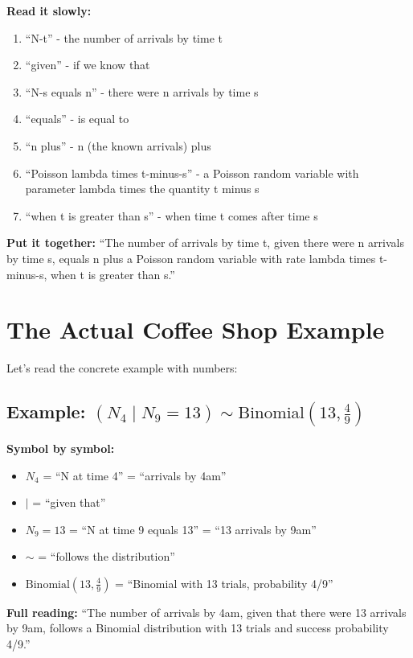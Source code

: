 \documentclass[11pt]{article}
\begin{document}
\textbf{Read it slowly:}
\begin{enumerate}
    \item ``N-t'' - the number of arrivals by time t
    \item ``given'' - if we know that
    \item ``N-s equals n'' - there were n arrivals by time s
    \item ``equals'' - is equal to
    \item ``n plus'' - n (the known arrivals) plus
    \item ``Poisson lambda times t-minus-s'' - a Poisson random variable with parameter lambda times the quantity t minus s
    \item ``when t is greater than s'' - when time t comes after time s
\end{enumerate}

\textbf{Put it together:} ``The number of arrivals by time t, given there were n arrivals by time s, equals n plus a Poisson random variable with rate lambda times t-minus-s, when t is greater than s.''

\section{The Actual Coffee Shop Example}

Let's read the concrete example with numbers:

\subsection{Example: $(N_4 \mid N_9 = 13) \sim \text{Binomial}(13, \frac{4}{9})$}

\textbf{Symbol by symbol:}
\begin{itemize}
    \item $N_4$ = ``N at time 4'' = ``arrivals by 4am''
    \item $\mid$ = ``given that''
    \item $N_9 = 13$ = ``N at time 9 equals 13'' = ``13 arrivals by 9am''
    \item $\sim$ = ``follows the distribution''
    \item $\text{Binomial}(13, \frac{4}{9})$ = ``Binomial with 13 trials, probability 4/9''
\end{itemize}

\textbf{Full reading:} ``The number of arrivals by 4am, given that there were 13 arrivals by 9am, follows a Binomial distribution with 13 trials and success probability 4/9.''
\end{document}
